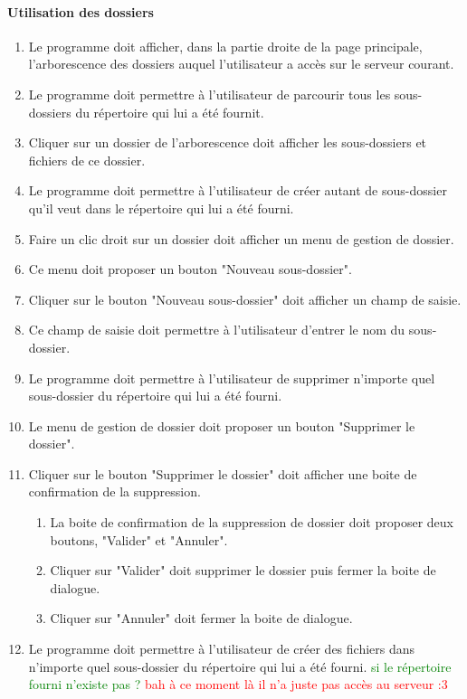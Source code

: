 \documentclass[10pt,a4paper]{report}
\begin{document}
\paragraph{Utilisation des dossiers}
	\begin{enumerate}
		\item Le programme doit afficher, dans la partie droite de la page principale, l'arborescence des dossiers auquel l'utilisateur a accès sur le serveur courant.
		\item Le programme doit permettre à l'utilisateur de parcourir tous les sous-dossiers du répertoire qui lui a été fournit.
		\item Cliquer sur un dossier de l'arborescence doit afficher les sous-dossiers et fichiers de ce dossier.
		\item Le programme doit permettre à l'utilisateur de créer autant de sous-dossier qu'il veut dans le répertoire qui lui a été fourni.
		\item Faire un clic droit sur un dossier doit afficher un menu de gestion de dossier.
		\item Ce menu doit proposer un bouton "Nouveau sous-dossier".
		\item Cliquer sur le bouton "Nouveau sous-dossier" doit afficher un champ de saisie.
		\item Ce champ de saisie doit permettre à l'utilisateur d'entrer le nom du sous-dossier.
		\item Le programme doit permettre à l'utilisateur de supprimer n'importe quel sous-dossier du répertoire qui lui a été fourni.
		\item Le menu de gestion de dossier doit proposer un bouton "Supprimer le dossier".
		\item Cliquer sur le bouton "Supprimer le dossier" doit afficher une boite de confirmation de la suppression.
		\begin{enumerate}[label=\arabic*.]
			\item La boite de confirmation de la suppression de dossier doit proposer deux boutons, "Valider" et "Annuler".
			\item Cliquer sur "Valider" doit supprimer le dossier puis fermer la boite de dialogue.
			\item Cliquer sur "Annuler" doit fermer la boite de dialogue.
		\end{enumerate}
		\item Le programme doit permettre à l'utilisateur de créer des fichiers dans n'importe quel sous-dossier du répertoire qui lui a été fourni.\textcolor{green}{ si le répertoire fourni n'existe pas ?} \textcolor{red}{bah à ce moment là il n'a juste pas accès au serveur :3}

\end{enumerate}
\end{document}
